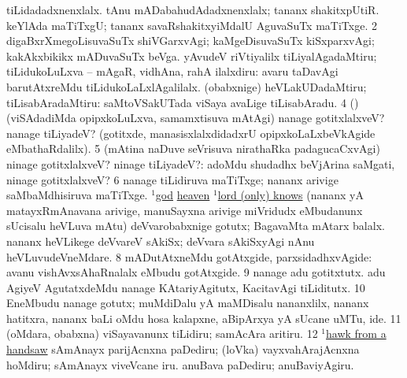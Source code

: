 \noindent
\gl{\nuga}
\bmng
\bnum
{}  
\banum
{} tiLidadadxnenxlalx. 
 tAnu mADabahudAdadxnenxlalx; tananx shakitxpUtiR. 
 keYlAda maTiTxgU; tananx savaRshakitxyiMdalU AguvaSuTx maTiTxge. 
\eanum
\numie
\num{2}  digaBxrXmegoLisuvaSuTx shiVGarxvAgi; kaMgeDisuvaSuTx kiSxparxvAgi; kakAkxbikikx mADuvaSuTx beVga. 
  
\banum
{} yAvudeV riVtiyalilx tiLiyalAgadaMtiru; tiLidukoLuLxva -- mAgaR, vidhAna, rahA ilalxdiru:  avaru taDavAgi barutAtxreMdu tiLidukoLaLxlAgalilalx. 
 (obabxnige) heVLakUDadaMtiru; tiLisabAradaMtiru:  saMtoVSakUTada viSaya avaLige tiLisabAradu. 
\eanum
\numie
\num{4}  (\AmA) (viSAdadiMda opipxkoLuLxva, samamxtisuva mAtAgi) nanage gotitxlalxveV? nanage tiLiyadeV? (gotitxde, manasisxlalxdidadxrU opipxkoLaLxbeVkAgide eMbathaRdalilx). 
\num{5}  (mAtina naDuve seVrisuva nirathaRka padagucaCxvAgi) ninage gotitxlalxveV? ninage tiLiyadeV?:  adoMdu shudadhx beVjArina saMgati, ninage gotitxlalxveV? 
\num{6}   nanage tiLidiruva maTiTxge; nananx arivige saMbaMdhisiruva maTiTxge. 
 \hyperref{kandict_g.pdf}{G}{god(1) pagu(12)}{$^1$god}  \hyperref{kandict_h.pdf}{H}{heaven pagu(6)}{heaven}   \hyperref{kandict_l.pdf}{L}{Lord(1) pagu(14)}{$^1$lord (only) knows} 
\banum
{} (nananx yA matayxRmAnavana arivige, manuSayxna arivige miVridudx eMbudanunx sUcisalu heVLuva mAtu) deVvarobabxnige gotutx; BagavaMta mAtarx balalx. 
 nananx heVLikege deVvareV sAkiSx; deVvara sAkiSxyAgi nAnu heVLuvudeVneMdare. 
\eanum
\numie
\num{8}  mADutAtxneMdu gotAtxgide, parxsidadhxvAgide:  avanu vishAvxsAhaRnalalx eMbudu gotAtxgide. 
\num{9}  nanage adu gotitxtutx. adu AgiyeV AgutatxdeMdu nanage KAtariyAgitutx, KacitavAgi tiLiditutx. 
\num{10}  EneMbudu nanage gotutx; muMdiDalu yA maMDisalu nananxlilx, nananx hatitxra, nananx baLi oMdu hosa kalapxne, aBipArxya yA sUcane uMTu, ide. 
\num{11}  (oMdara, obabxna) viSayavanunx tiLidiru; samAcAra aritiru. 
\num{12}  \hyperref{kandict_h.pdf}{H}{hawk(1) nuga}{$^1$hawk from a handsaw} sAmAnayx parijAcnxna paDediru; (loVka) vayxvahArajAcnxna hoMdiru; sAmAnayx viveVcane iru. 
  
\banum
{} anuBava paDediru; anuBaviyAgiru. 
